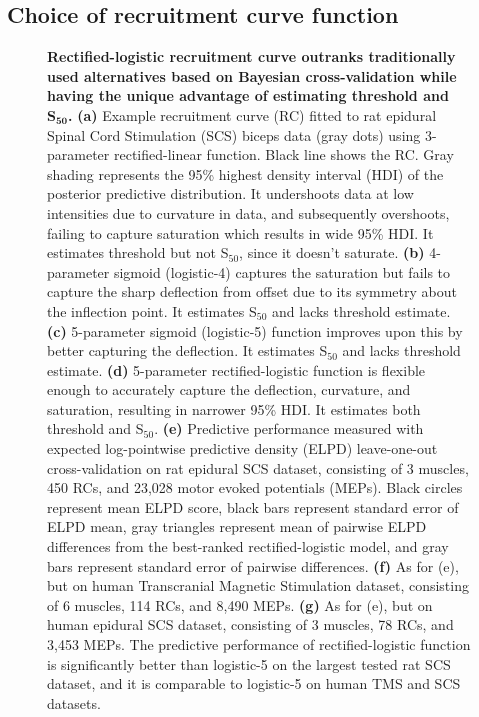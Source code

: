 \documentclass[pdflatex,sn-mathphys-ay]{sn-jnl}%
\numberwithin{equation}{subsection}
\theoremstyle{thmstyleone}%
\theoremstyle{thmstyletwo}%
\theoremstyle{thmstylethree}%
\begin{document}
\subsection{Choice of recruitment curve function}\label{res-choice}
\begin{figure}[h]
    \centering
    \caption{\textbf{Rectified-logistic recruitment curve outranks traditionally used alternatives based on Bayesian cross-validation while having the unique advantage of estimating threshold and $\textbf{S}_\mathbf{50}$.} \textbf{(a)} Example recruitment curve (RC) fitted to rat epidural Spinal Cord Stimulation (SCS) biceps data (gray dots) using 3-parameter rectified-linear function. Black line shows the RC. Gray shading represents the 95\% highest density interval (HDI) of the posterior predictive distribution. It undershoots data at low intensities due to curvature in data, and subsequently overshoots, failing to capture saturation which results in wide 95\% HDI. It estimates threshold but not S$_{50}$, since it doesn’t saturate. \textbf{(b)} 4-parameter sigmoid (logistic-4) captures the saturation but fails to capture the sharp deflection from offset due to its symmetry about the inflection point. It estimates S$_{50}$ and lacks threshold estimate. \textbf{(c)} 5-parameter sigmoid (logistic-5) function improves upon this by better capturing the deflection. It estimates S$_{50}$ and lacks threshold estimate. \textbf{(d)} 5-parameter rectified-logistic function is flexible enough to accurately capture the deflection, curvature, and saturation, resulting in narrower 95\% HDI. It estimates both threshold and S$_{50}$. \textbf{(e)} Predictive performance measured with expected log-pointwise predictive density (ELPD) leave-one-out cross-validation on rat epidural SCS dataset, consisting of 3 muscles, 450 RCs, and 23,028 motor evoked potentials (MEPs). Black circles represent mean ELPD score, black bars represent standard error of ELPD mean, gray triangles represent mean of pairwise ELPD differences from the best-ranked rectified-logistic model, and gray bars represent standard error of pairwise differences. \textbf{(f)} As for (e), but on human Transcranial Magnetic Stimulation dataset, consisting of 6 muscles, 114 RCs, and 8,490 MEPs. \textbf{(g)} As for (e), but on human epidural SCS dataset, consisting of 3 muscles, 78 RCs, and 3,453 MEPs. The predictive performance of rectified-logistic function is significantly better than logistic-5 on the largest tested rat SCS dataset, and it is comparable to logistic-5 on human TMS and SCS datasets.}\label{fig-choice}
\end{figure}
\end{document}
